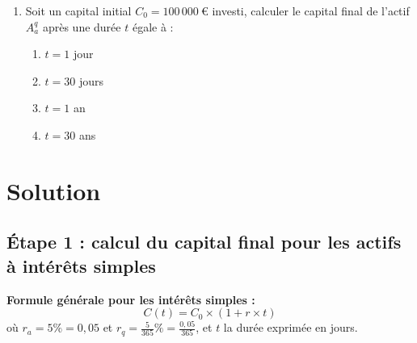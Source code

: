 \documentclass{article}
\begin{document}
\begin{enumerate}[label=\textbf{Q1.\arabic*}]
\begin{enumerate}[label=\textbf{Q2.\arabic*}]
        \item Soit un capital initial \( C_0 = 100\,000\ \text{€} \) investi, calculer le capital final de l'actif \( A_a^q \) après une durée \( t \) égale à :
        \begin{enumerate}[label=(\alph*)]
            \item \( t = 1 \) jour
            \item \( t = 30 \) jours
            \item \( t = 1 \) an
            \item \( t = 30 \) ans
        \end{enumerate}
    \end{enumerate}

\end{enumerate}

\newpage
\section{Solution}
\subsection*{Étape 1 : calcul du capital final pour les actifs à intérêts simples}

\noindent
\textbf{Formule générale pour les intérêts simples :}
\[
C(t) = C_0 \times \left(1 + r \times t\right)
\]
où $r_a = 5\% = 0,05$ et \( r_q = \frac{5}{365}\% = \frac{0,05}{365} \), et \( t \) la durée exprimée en jours.
\end{document}
